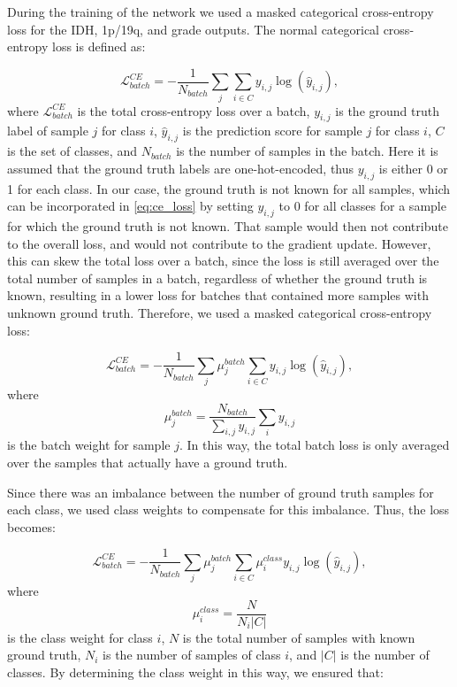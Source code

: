 \begin{subappendices}
During the training of the network we used a masked categorical cross-entropy loss for the \gls{IDH}, 1p/19q, and grade outputs.
The normal categorical cross-entropy loss is defined as:

\begin{equation}
    \mathcal{L}^{CE}_{batch} = -\frac{1}{N_{batch}} \sum_{j} \sum_{i \in C} y_{i, j} \log \left(\hat{y}_{i, j} \right),
\label{eq:ce_loss}
\end{equation}
where $\mathcal{L}^{CE}_{batch}$ is the total cross-entropy loss over a batch, $y_{i,j}$ is the ground truth label of sample $j$ for class $i$, $\hat{y}_{i,j}$ is the prediction score for sample $j$ for class $i$, $C$ is the set of classes, and $N_{batch}$ is the number of samples in the batch.
Here it is assumed that the ground truth labels are one-hot-encoded, thus $y_{i,j}$ is either 0 or 1 for each class.
In our case, the ground truth is not known for all samples, which can be incorporated in  \cref{eq:ce_loss} by setting $y_{i,j}$ to 0 for all classes for a sample for which the ground truth is not known.
That sample would then not contribute to the overall loss, and would not contribute to the gradient update.
However, this can skew the total loss over a batch, since the loss is still averaged over the total number of samples in a batch, regardless of whether the ground truth is known, resulting in a lower loss for batches that contained more samples with unknown ground truth.
Therefore, we used a masked categorical cross-entropy loss:

\begin{equation}
    \mathcal{L}^{CE}_{batch} = -\frac{1}{N_{batch}} \sum_{j} \mu_j^{batch} \sum_{i \in C} y_{i, j} \log \left(\hat{y}_{i, j} \right),
\end{equation}
where
\begin{equation}
\mu_j^{batch} = \frac{N_{batch}}{\sum_{i,j} y_{i,j}} \sum_i y_{i,j}
\end{equation}
is the batch weight for sample $j$.
In this way, the total batch loss is only averaged over the samples that actually have a ground truth.

Since there was an imbalance between the number of ground truth samples for each class, we used class weights to compensate for this imbalance.
Thus, the loss becomes:

\begin{equation}
    \mathcal{L}^{CE}_{batch} = -\frac{1}{N_{batch}} \sum_{j} \mu_j^{batch} \sum_{i \in C} \mu_i^{class} y_{i, j} \log \left(\hat{y}_{i, j} \right),
\end{equation}
where
\begin{equation}
    \mu_{i}^{class} =  \frac{N}{N_{i} \left|C\right|}
\end{equation}
is the class weight for class $i$, $N$ is the total number of samples with known ground truth, $N_i$ is the number of samples of class $i$, and $\left|C\right|$ is the number of classes.
By determining the class weight in this way, we ensured that:


\end{subappendices}
